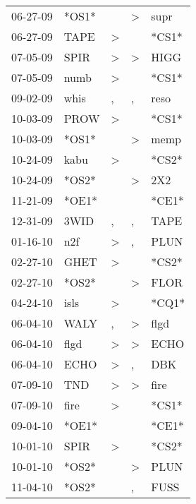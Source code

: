 \begin{supertabular}{lllll}
 06-27-09 &  *OS1* &                  &     \textgreater &   supr \\
 06-27-09 &   TAPE &     \textgreater &                  &  *CS1* \\
 07-05-09 &   SPIR &     \textgreater &     \textgreater &   HIGG \\
 07-05-09 &   numb &     \textgreater &                  &  *CS1* \\
 09-02-09 &   whis &                , &                , &   reso \\
 10-03-09 &   PROW &     \textgreater &                  &  *CS1* \\
 10-03-09 &  *OS1* &                  &     \textgreater &   memp \\
 10-24-09 &   kabu &     \textgreater &                  &  *CS2* \\
 10-24-09 &  *OS2* &                  &     \textgreater &    2X2 \\
 11-21-09 &  *OE1* &                  &                  &  *CE1* \\
 12-31-09 &   3WID &                , &                , &   TAPE \\
 01-16-10 &    n2f &     \textgreater &                , &   PLUN \\
 02-27-10 &   GHET &     \textgreater &                  &  *CS2* \\
 02-27-10 &  *OS2* &                  &     \textgreater &   FLOR \\
 04-24-10 &   isls &     \textgreater &                  &  *CQ1* \\
 06-04-10 &   WALY &                , &     \textgreater &   flgd \\
 06-04-10 &   flgd &     \textgreater &     \textgreater &   ECHO \\
 06-04-10 &   ECHO &     \textgreater &                , &    DBK \\
 07-09-10 &    TND &     \textgreater &     \textgreater &   fire \\
 07-09-10 &   fire &     \textgreater &                  &  *CS1* \\
 09-04-10 &  *OE1* &                  &                  &  *CE1* \\
 10-01-10 &   SPIR &     \textgreater &                  &  *CS2* \\
 10-01-10 &  *OS2* &                  &     \textgreater &   PLUN \\
 11-04-10 &  *OS2* &                  &                , &   FUSS \\

\end{supertabular}
